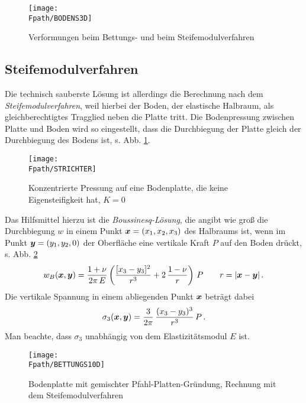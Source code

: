 \begin{figure}[tbp]
\centering
\if {} \sidecaption \fi
\texttt{[image: \\Fpath/BODENS3D]}
\caption{Verformungen beim Bettungs- und beim Steifemodulverfahren}
\label{BodenS3}
\end{figure}%

{\textcolor{sectionTitleBlue}{\subsection{Steifemodulverfahren}}}
Die technisch sauberste L\"{o}sung ist allerdings die Berechnung nach dem {\em Steifemodulverfahren}, weil hierbei der Boden, der elastische Halbraum, als gleichberechtigtes Tragglied neben die Platte tritt. Die Bodenpressung zwischen Platte und Boden wird so eingestellt, dass die Durchbiegung der Platte gleich der Durchbiegung des Bodens ist, s. Abb. \ref{BodenS3}.\\
\begin{figure}[tbp]
\centering
\if {} \sidecaption \fi
\texttt{[image: \\Fpath/STRICHTER]}
\caption{Konzentrierte Pressung auf eine Bodenplatte, die keine Eigensteifigkeit hat, $K
= 0$} \label{STrichter}
\end{figure}%

Das Hilfsmittel hierzu ist die {\em Boussinesq-L\"{o}sung\/}, die angibt wie gro{\ss} die Durchbiegung $w$ in einem Punkt $\mbox{\boldmath $x$} = (x_1,x_2,x_3)$ des Halbraums ist, wenn im Punkt $\mbox{\boldmath $y$} = (y_1,y_2,0)$ der Oberfl\"{a}che eine vertikale Kraft $P$ auf den Boden dr\"{u}ckt, s. Abb. \ref{STrichter}
\begin{align}\label{Boussinesq2}
w_B(\mbox{\boldmath $x$},\mbox{\boldmath $y$}) = \frac{1+\nu}{2\pi\,E} \left( \frac{[x_3 - y_3]^2}{r^3} +
2\,\frac{1-\nu}{r}\right)\,P \qquad r =  |\mbox{\boldmath $x$} - \mbox{\boldmath $y$}|\,.
\end{align}
Die vertikale Spannung in einem abliegenden Punkt $\mbox{\boldmath $x$}$ betr\"{a}gt dabei
\begin{align}
\sigma_3(\mbox{\boldmath $x$},\mbox{\boldmath $y$}) = \frac{3}{2\pi} \,\frac{(x_3 - y_3)^3}{r^3}\,P\,.
\end{align}
Man beachte, dass $\sigma_3$ unabh\"{a}ngig von dem Elastizit\"{a}tsmodul $E$ ist.
\begin{figure}[tbp]
\centering
\if {} \sidecaption \fi
\texttt{[image: \\Fpath/BETTUNGS10D]}
\caption{Bodenplatte mit gemischter Pfahl-Platten-Gr\"{u}ndung, Rechnung mit dem
Steifemodulverfahren} \label{BettungS10}
\end{figure}%

